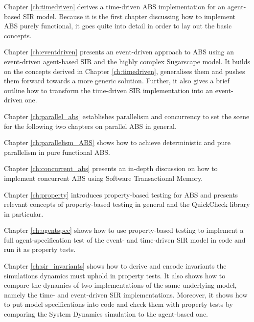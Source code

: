 \medskip

Chapter \ref{ch:timedriven} derives a time-driven ABS implementation for an agent-based SIR model. Because it is the first chapter discussing how to implement ABS purely functional, it goes quite into detail in order to lay out the basic concepts.

\medskip

Chapter \ref{ch:eventdriven} presents an event-driven approach to ABS using an event-driven agent-based SIR and the highly complex Sugarscape model. It builds on the concepts derived in Chapter \ref{ch:timedriven}, generalises them and pushes them forward towards a more generic solution. Further, it also gives a brief outline how to transform the time-driven SIR implementation into an event-driven one.

\medskip

Chapter \ref{ch:parallel_abs} establishes parallelism and concurrency to set the scene for the following two chapters on parallel ABS in general.

\medskip

Chapter \ref{ch:parallelism_ABS} shows how to achieve deterministic and pure parallelism in pure functional ABS. 

\medskip

Chapter \ref{ch:concurrent_abs} presents an in-depth discussion on how to implement concurrent ABS using Software Transactional Memory.

\medskip

Chapter \ref{ch:property} introduces property-based testing for ABS and presents relevant concepts of property-based testing in general and the QuickCheck library in particular. 

\medskip

Chapter \ref{ch:agentspec} shows how to use property-based testing to implement a full agent-specification test of the event- and time-driven SIR model in code and run it as property tests.

\medskip

Chapter \ref{ch:sir_invariants} shows how to derive and encode invariants the simulations dynamics must uphold in property tests. It also shows how to compare the dynamics of two implementations of the same underlying model, namely the time- and event-driven SIR implementations. Moreover, it shows how to put model specifications into code and check them with property tests by comparing the System Dynamics simulation to the agent-based one.

\medskip

